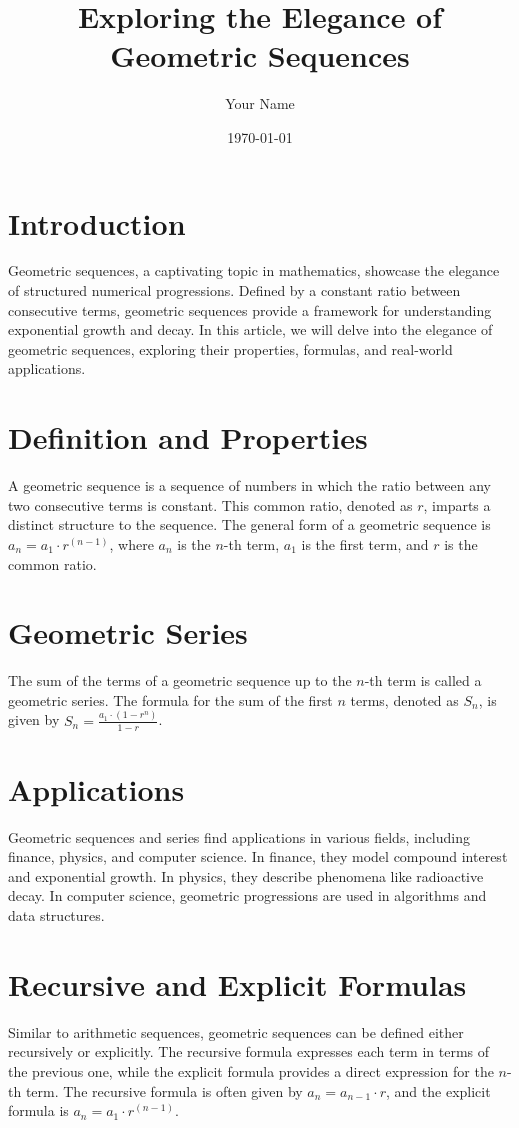 \documentclass{article}
\title{Exploring the Elegance of Geometric Sequences}
\author{Your Name}
\date{\today}
\begin{document}
\maketitle

\section*{Introduction}
Geometric sequences, a captivating topic in mathematics, showcase the elegance of structured numerical progressions. Defined by a constant ratio between consecutive terms, geometric sequences provide a framework for understanding exponential growth and decay. In this article, we will delve into the elegance of geometric sequences, exploring their properties, formulas, and real-world applications.

\section*{Definition and Properties}
A geometric sequence is a sequence of numbers in which the ratio between any two consecutive terms is constant. This common ratio, denoted as $r$, imparts a distinct structure to the sequence. The general form of a geometric sequence is $a_n = a_1 \cdot r^{(n-1)}$, where $a_n$ is the $n$-th term, $a_1$ is the first term, and $r$ is the common ratio.

\section*{Geometric Series}
The sum of the terms of a geometric sequence up to the $n$-th term is called a geometric series. The formula for the sum of the first $n$ terms, denoted as $S_n$, is given by $S_n = \frac{a_1 \cdot (1 - r^n)}{1 - r}$.

\section*{Applications}
Geometric sequences and series find applications in various fields, including finance, physics, and computer science. In finance, they model compound interest and exponential growth. In physics, they describe phenomena like radioactive decay. In computer science, geometric progressions are used in algorithms and data structures.

\section*{Recursive and Explicit Formulas}
Similar to arithmetic sequences, geometric sequences can be defined either recursively or explicitly. The recursive formula expresses each term in terms of the previous one, while the explicit formula provides a direct expression for the $n$-th term. The recursive formula is often given by $a_n = a_{n-1} \cdot r$, and the explicit formula is $a_n = a_1 \cdot r^{(n-1)}$.
\end{document}
